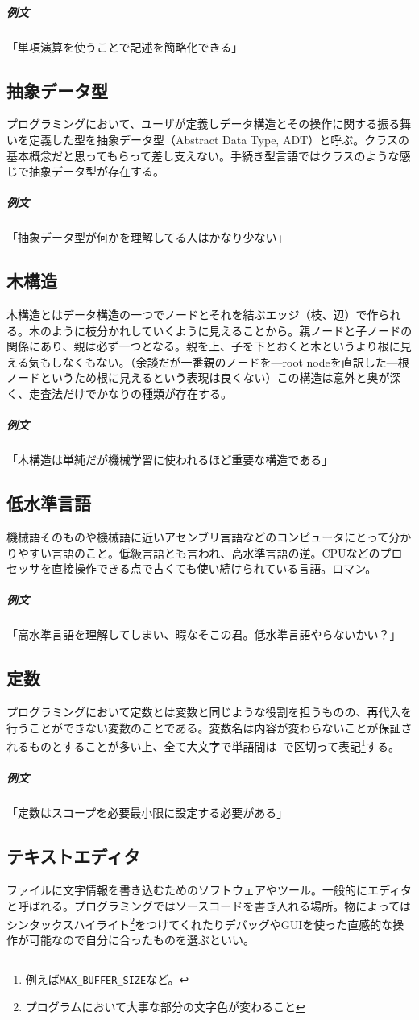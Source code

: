 \documentclass[a4paper]{ltjsreport}
\newcommand{\terlogy}[2][|]{\colorbox{terlogy}{\texttt{\lstinline#1#2#1}}}
\begin{document}
\subparagraph{例文}「単項演算を使うことで記述を簡略化できる」

\subsection{抽象データ型}
プログラミングにおいて、ユーザが定義しデータ構造とその操作に関する振る舞いを定義した型を抽象データ型（Abstract Data Type, ADT）と呼ぶ。クラスの基本概念だと思ってもらって差し支えない。手続き型言語ではクラスのような感じで抽象データ型が存在する。

\subparagraph{例文}「抽象データ型が何かを理解してる人はかなり少ない」

\subsection{木構造}
木構造とはデータ構造の一つでノードとそれを結ぶエッジ（枝、辺）で作られる。木のように枝分かれしていくように見えることから。親ノードと子ノードの関係にあり、親は必ず一つとなる。親を上、子を下とおくと木というより根に見える気もしなくもない。（余談だが一番親のノードを---root nodeを直訳した---根ノードというため根に見えるという表現は良くない）この構造は意外と奥が深く、走査法だけでかなりの種類が存在する。

\subparagraph{例文}「木構造は単純だが機械学習に使われるほど重要な構造である」

\subsection{低水準言語}
機械語そのものや機械語に近いアセンブリ言語などのコンピュータにとって分かりやすい言語のこと。低級言語とも言われ、高水準言語の逆。CPUなどのプロセッサを直接操作できる点で古くても使い続けられている言語。ロマン。

\subparagraph{例文}「高水準言語を理解してしまい、暇なそこの君。低水準言語やらないかい？」

\subsection{定数}
プログラミングにおいて定数とは変数と同じような役割を担うものの、再代入を行うことができない変数のことである。変数名は内容が変わらないことが保証されるものとすることが多い上、全て大文字で単語間は\terlogy{_}で区切って表記\footnote{例えば\terlogy{MAX_BUFFER_SIZE}など。}する。

\subparagraph{例文}「定数はスコープを必要最小限に設定する必要がある」

\subsection{テキストエディタ}
ファイルに文字情報を書き込むためのソフトウェアやツール。一般的にエディタと呼ばれる。プログラミングではソースコードを書き入れる場所。物によってはシンタックスハイライト\footnote{プログラムにおいて大事な部分の文字色が変わること}をつけてくれたりデバッグやGUIを使った直感的な操作が可能なので自分に合ったものを選ぶといい。
\end{document}
